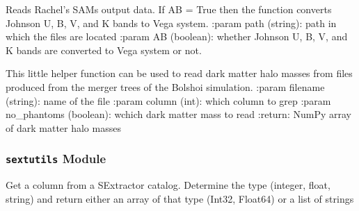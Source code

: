 \documentclass[letterpaper,10pt,english]{sphinxmanual}
\begin{document}

\begin{fulllineitems}
\label{SamPy.smnIO:SamPy.smnIO.read.GFBasicData}
Reads Rachel's SAMs output data.
If AB = True then the function converts
Johnson U, B, V, and K bands to Vega system.
:param path (string): path in which the files are located
:param AB (boolean): whether Johnson U, B, V, and K bands
are converted to Vega system or not.

\end{fulllineitems}



\begin{fulllineitems}
\label{SamPy.smnIO:SamPy.smnIO.read.readBolshoiDMfile}
This little helper function can be used to read
dark matter halo masses from files produced from
the merger trees of the Bolshoi simulation.
:param filename (string): name of the file
:param column (int): which column to grep
:param no\_phantoms (boolean): wchich dark matter mass to read
:return: NumPy array of dark matter halo masses

\end{fulllineitems}



\subsubsection{\texttt{sextutils} Module}
\label{SamPy.smnIO:sextutils-module}\label{SamPy.smnIO:module-SamPy.smnIO.sextutils}

\begin{fulllineitems}
\label{SamPy.smnIO:SamPy.smnIO.sextutils.getcol}
Get a column from a SExtractor catalog. Determine the type
(integer, float, string) and return either an array of that
type (Int32, Float64) or a list of strings

\end{fulllineitems}


\end{document}
